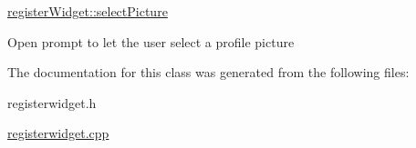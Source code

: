\hyperlink{classregisterWidget_a69c2a6929e0adbd79b215812cb7c582f}{register\-Widget\-::select\-Picture} 

Open prompt to let the user select a profile picture 

The documentation for this class was generated from the following files\-:\begin{DoxyCompactItemize}
\item 
registerwidget.\-h\item 
\hyperlink{registerwidget_8cpp}{registerwidget.\-cpp}\end{DoxyCompactItemize}
